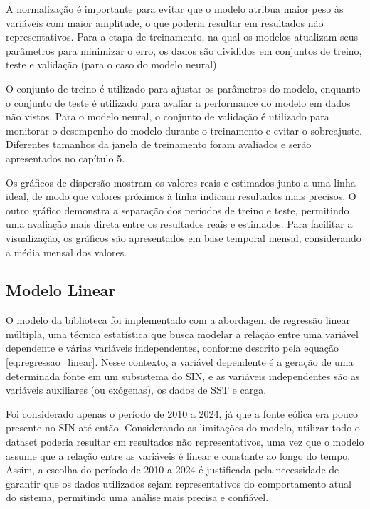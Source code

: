 A normalização é importante para evitar que o modelo atribua maior peso às variáveis com maior amplitude,
o que poderia resultar em resultados não representativos. Para a etapa de treinamento, na qual os modelos atualizam seus parâmetros 
para minimizar o erro, os dados são divididos em conjuntos de treino, teste e validação (para o caso do modelo neural). 

O conjunto de treino é utilizado para ajustar os parâmetros 
do modelo, enquanto o conjunto de teste é utilizado para avaliar a performance do modelo em dados não vistos. Para o modelo neural, 
o conjunto de validação é utilizado para monitorar o desempenho do modelo durante o treinamento e evitar o sobreajuste. 
Diferentes tamanhos da janela de treinamento foram avaliados e serão apresentados no capítulo 5.

Os gráficos de dispersão mostram os valores reais e estimados junto a uma linha ideal, de modo que valores próximos à linha indicam 
resultados mais precisos. O outro gráfico demonstra a separação dos períodos de treino e teste, permitindo uma avaliação mais direta 
entre os resultados reais e estimados. Para facilitar a visualização, os gráficos são apresentados em base temporal mensal, 
considerando a média mensal dos valores.

\subsection{Modelo Linear} %
O modelo  da biblioteca  foi implementado com a abordagem de regressão linear múltipla, 
uma técnica estatística que busca modelar a relação entre uma variável dependente e várias variáveis independentes, conforme descrito pela 
equação \ref{eq:regressao_linear}. Nesse contexto, a variável dependente é a geração de uma determinada fonte em um subsistema do 
SIN, e as variáveis independentes são as variáveis auxiliares (ou exógenas), os dados de SST e carga.

Foi considerado apenas o período de 2010 a 2024, já que a fonte eólica era pouco presente
no SIN até então. Considerando as limitações do modelo, utilizar todo o dataset poderia resultar em resultados não representativos, 
uma vez que o modelo assume que a relação entre as variáveis é linear e constante ao longo do tempo. Assim, a escolha do período 
de 2010 a 2024 é justificada pela necessidade de garantir que os dados utilizados sejam representativos do comportamento atual 
do sistema, permitindo uma análise mais precisa e confiável.

